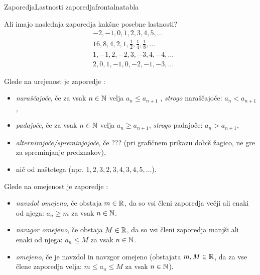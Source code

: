 \begin{priprava}{}{}{Zaporedja}{Lastnosti zaporedja}{frontalna}{tabla}


Ali imajo naslednja zaporedja kakšne posebne lastnosti? 
\begin{align*}
    & -2, -1, 0, 1, 2, 3, 4, 5, \ldots \\
    & 16, 8, 4, 2, 1, \frac{1}{2}, \frac{1}{4}, \frac{1}{8}, \ldots \\
    & 1, -1, 2, -2, 3, -3, 4, -4, \ldots \\
    & 2, 0, 1, -1, 0, -2, -1, -3, \ldots
\end{align*}


Glede na urejenost je zaporedje :
\begin{itemize}
    \item \emph{naraščajoče}, če za vsak $ n \in \mathbb{N} $ velja $ a_n \leq a_{n+1} $ ,
    \subitem \emph{strogo} naraščajoče: $ a_n < a_{n+1} $,
    \item \emph{padajoče}, če za vsak $ n \in \mathbb{N} $ velja $ a_n \geq a_{n+1} $,
    \subitem \emph{strogo} padajoče: $ a_n > a_{n+1} $,
    \item \emph{alternirajoče/spreminjajoče}, če ??? (pri grafičnem prikazu dobiš žagico, ne gre za spreminjanje predznakov),
    \item nič od naštetega (npr. $ 1, 2, 3, 2, 3, 4, 3, 4, 5, \ldots $).
\end{itemize}

Glede na omejenost je zaporedje :
\begin{itemize}
    \item \emph{navzdol omejeno}, če obstaja $ m \in \mathbb{R} $, da so vsi členi zaporedja večji ali enaki od njega: $ a_n \geq m $ za vsak $ n \in \mathbb{N} $.
    \item \emph{navzgor omejeno}, če obstaja $ M \in \mathbb{R} $, da so vsi členi zaporedja manjši ali enaki od njega: $ a_n \leq M $ za vsak $ n \in \mathbb{N} $.
    \item \emph{omejeno}, če je navzdol in navzgor omejeno (obstajata $ m, M \in \mathbb{R} $, da za vse člene zaporedja velja: $ m \leq a_n \leq M $ za vsak $ n \in \mathbb{N} $).
\end{itemize}


\end{priprava}
